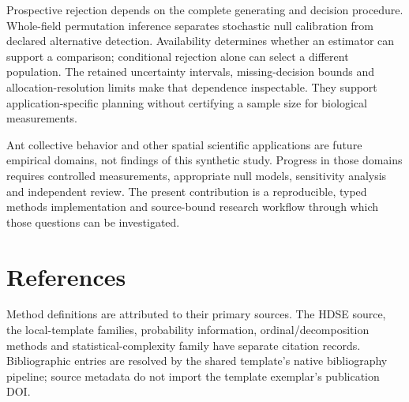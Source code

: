 \documentclass[
  english,
  11pt,
]{article}
\renewcommand{\bibsection}{}
\begin{document}
Prospective rejection depends on the complete generating and decision
procedure. Whole-field permutation inference separates stochastic null
calibration from declared alternative detection. Availability determines
whether an estimator can support a comparison; conditional rejection
alone can select a different population. The retained uncertainty
intervals, missing-decision bounds and allocation-resolution limits make
that dependence inspectable. They support application-specific planning
without certifying a sample size for biological measurements.

Ant collective behavior and other spatial scientific applications are
future empirical domains, not findings of this synthetic study. Progress
in those domains requires controlled measurements, appropriate null
models, sensitivity analysis and independent review. The present
contribution is a reproducible, typed methods implementation and
source-bound research workflow through which those questions can be
investigated.

\section*{References}\label{references}

Method definitions are attributed to their primary sources. The HDSE
source, the local-template families, probability information,
ordinal/decomposition methods and statistical-complexity family have
separate citation records. Bibliographic entries are resolved by the
shared template's native bibliography pipeline; source metadata do not
import the template exemplar's publication DOI.



\providecommand{\bibsection}{}
\renewcommand{\bibsection}{}


\end{document}
